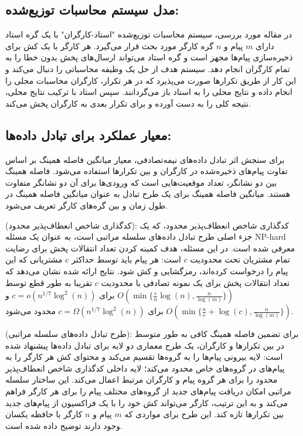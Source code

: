 \subsection*{مدل سیستم محاسبات توزیع‌شده:}
در مقاله مورد بررسی، سیستم محاسبات توزیع‌شده "استاد-کارگران" با یک گره استاد دارای \(m\) پیام و \(n\) گره کارگر مورد بحث قرار می‌گیرد. هر کارگر با یک کش برای ذخیره‌سازی پیام‌ها مجهز است و گره استاد می‌تواند ارسال‌های پخش بدون خطا را به تمام کارگران انجام دهد. سیستم هدف از حل یک وظیفه محاسباتی را دنبال می‌کند و این کار از طریق تکرارها صورت می‌پذیرد که در هر تکرار، کارگران محاسبات محلی را انجام داده و نتایج محلی را به استاد باز می‌گردانند. سپس استاد با ترکیب نتایج محلی، نتیجه کلی را به دست آورده و برای تکرار بعدی به کارگران پخش می‌کند.

\subsection*{معیار عملکرد برای تبادل داده‌ها:}
برای سنجش اثر تبادل داده‌های نیمه‌تصادفی، معیار میانگین فاصله همینگ بر اساس تفاوت پیام‌های ذخیره‌شده در کارگران و بین تکرارها استفاده می‌شود. فاصله همینگ بین دو نشانگر، تعداد موقعیت‌هایی است که ورودی‌ها برای آن دو نشانگر متفاوت هستند. میانگین فاصله همینگ برای یک طرح تبادل به عنوان میانگین فاصله همینگ در طول زمان و بین گره‌های کارگر تعریف می‌شود.

\begin{theorem}{ (کدگذاری شاخص انعطاف‌پذیر محدود):}
	کدگذاری شاخص انعطاف‌پذیر محدود، که یک جزء اصلی طرح تبادل داده‌های سلسله مراتبی است، به عنوان یک مسئله NP-hard معرفی شده است. در این مسئله، هدف کمینه کردن تعداد انتقالات پخش برای رضایت تمام مشتریان تحت محدودیت \(c\) است: هر پیام باید توسط حداکثر \(c\) مشتریانی که این پیام را درخواست کرده‌اند، رمزگشایی و کش شود. نتایج ارائه شده نشان می‌دهد که تعداد انتقالات پخش برای یک نمونه تصادفی با محدودیت \(c\) تقریبا به طور قطع توسط \(O(\min\{\frac{c}{n} \log(n), \frac{n}{\log(m)}\})\) برای \(c = o(n^{1/7} \log^2(n))\) و \(O(\min\{\frac{n}{c} + \log(c), \frac{n}{\log(m)}\})\) برای \(c = \Omega(n^{1/7} \log^2(n))\) محدود می‌شود.
\end{theorem}

\begin{theorem}{ (طرح تبادل داده‌های سلسله مراتبی):}
	برای تضمین فاصله همینگ کافی به طور متوسط در بین تکرارها و کارگران، یک طرح معماری دو لایه برای تبادل داده‌ها پیشنهاد شده است: لایه بیرونی پیام‌ها را به گروه‌ها تقسیم می‌کند و محتوای کش هر کارگر را به پیام‌های در گروه‌های خاص محدود می‌کند؛ لایه داخلی کدگذاری شاخص انعطاف‌پذیر محدود را برای هر گروه پیام و کارگران مرتبط اعمال می‌کند. این ساختار سلسله مراتبی امکان دریافت پیام‌های جدید از گروه‌های مختلف پیام را برای هر کارگر فراهم می‌کند و به این ترتیب، کارگر می‌تواند کش خود را با یک فراکسیون از پیام‌های جدید بین تکرارها تازه کند. این طرح برای مواردی که \(m\) پیام و \(n\) کارگر با حافظه یکسان وجود دارند توضیح داده شده است.
\end{theorem}
